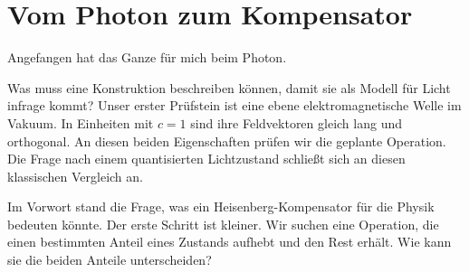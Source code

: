 \section{Vom Photon zum Kompensator}
\label{sec:question}

Angefangen hat das Ganze für mich beim Photon.

Was muss eine Konstruktion beschreiben können, damit sie als Modell für Licht infrage kommt? Unser erster Prüfstein ist eine ebene elektromagnetische Welle im Vakuum. In Einheiten mit \(c=1\) sind ihre Feldvektoren gleich lang und orthogonal. An diesen beiden Eigenschaften prüfen wir die geplante Operation. Die Frage nach einem quantisierten Lichtzustand schließt sich an diesen klassischen Vergleich an.

Im Vorwort stand die Frage, was ein Heisenberg-Kompensator für die Physik bedeuten könnte. Der erste Schritt ist kleiner. Wir suchen eine Operation, die einen bestimmten Anteil eines Zustands aufhebt und den Rest erhält. Wie kann sie die beiden Anteile unterscheiden?
